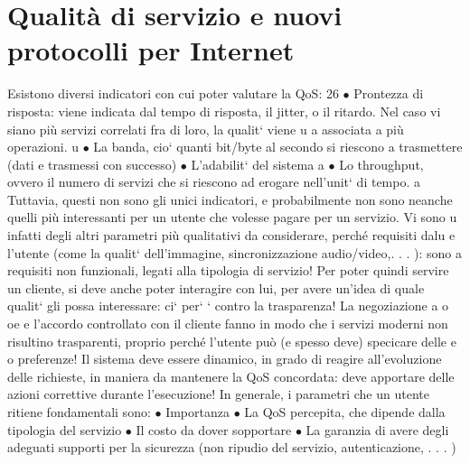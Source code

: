 \documentclass[a4paper,12pt]{article}
\begin{document}
\section{Qualità di servizio e nuovi protocolli per Internet}
Esistono diversi indicatori con cui poter valutare la QoS:
26
$\bullet$ Prontezza di risposta: viene indicata dal tempo di risposta, il jitter, o il
ritardo. Nel caso vi siano più servizi correlati fra di loro, la qualit` viene
u
a
associata a più operazioni.
u
$\bullet$ La banda, cio` quanti bit/byte al secondo si riescono a trasmettere (dati
e
trasmessi con successo)
$\bullet$ L'adabilit` del sistema
a
$\bullet$ Lo throughput, ovvero il numero di servizi che si riescono ad erogare
nell'unit` di tempo.
a
Tuttavia, questi non sono gli unici indicatori, e probabilmente non sono neanche
quelli più interessanti per un utente che volesse pagare per un servizio. Vi sono
u
infatti degli altri parametri più qualitativi da considerare, perché requisiti dalu
e
l'utente (come la qualit` dell'immagine, sincronizzazione audio/video,. . . ): sono
a
requisiti non funzionali, legati alla tipologia di servizio! Per poter quindi servire
un cliente, si deve anche poter interagire con lui, per avere un'idea di quale
qualit` gli possa interessare: ci` per` ` contro la trasparenza! La negoziazione
a
o
oe
e l'accordo controllato con il cliente fanno in modo che i servizi moderni non
risultino trasparenti, proprio perché l'utente può (e spesso deve) specicare delle
e
o
preferenze! Il sistema deve essere dinamico, in grado di reagire all'evoluzione
delle richieste, in maniera da mantenere la QoS concordata: deve apportare
delle azioni correttive durante l'esecuzione! In generale, i parametri che un
utente ritiene fondamentali sono:
$\bullet$ Importanza
$\bullet$ La QoS percepita, che dipende dalla tipologia del servizio
$\bullet$ Il costo da dover sopportare
$\bullet$ La garanzia di avere degli adeguati supporti per la sicurezza (non ripudio
del servizio, autenticazione, . . . )
\end{document}
